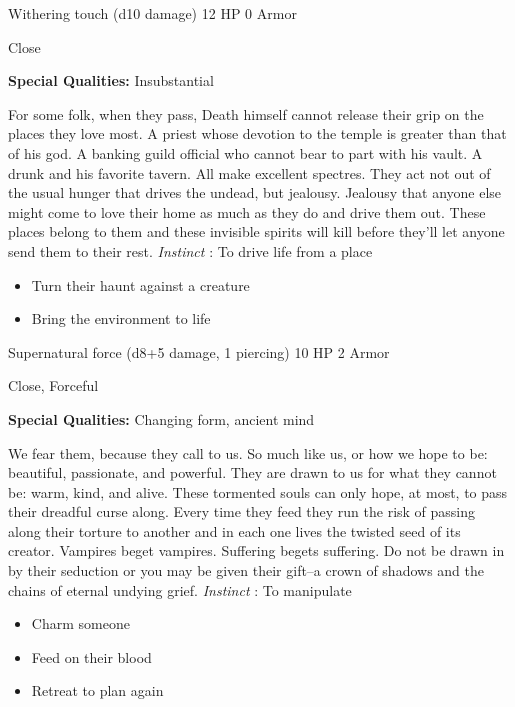 

 Withering touch (d10 damage) 12 HP 0 Armor


 Close


 \textbf{Special Qualities:}
 Insubstantial


 For some folk, when they pass, Death himself cannot release their grip on the places they love most. A priest whose devotion to the temple is greater than that of his god. A banking guild official who cannot bear to part with his vault. A drunk and his favorite tavern. All make excellent spectres. They act not out of the usual hunger that drives the undead, but jealousy. Jealousy that anyone else might come to love their home as much as they do and drive them out. These places belong to them and these invisible spirits will kill before they'll let anyone send them to their rest. \emph{Instinct}
: To drive life from a place
\begin{itemize}
\item Turn their haunt against a creature
\item Bring the environment to life

\end{itemize}




 Supernatural force (d8+5 damage, 1 piercing) 10 HP 2 Armor


 Close, Forceful


 \textbf{Special Qualities:}
 Changing form, ancient mind


 We fear them, because they call to us. So much like us, or how we hope to be: beautiful, passionate, and powerful. They are drawn to us for what they cannot be: warm, kind, and alive. These tormented souls can only hope, at most, to pass their dreadful curse along. Every time they feed they run the risk of passing along their torture to another and in each one lives the twisted seed of its creator. Vampires beget vampires. Suffering begets suffering. Do not be drawn in by their seduction or you may be given their gift--a crown of shadows and the chains of eternal undying grief. \emph{Instinct}
: To manipulate
\begin{itemize}
\item Charm someone
\item Feed on their blood
\item Retreat to plan again

\end{itemize}


